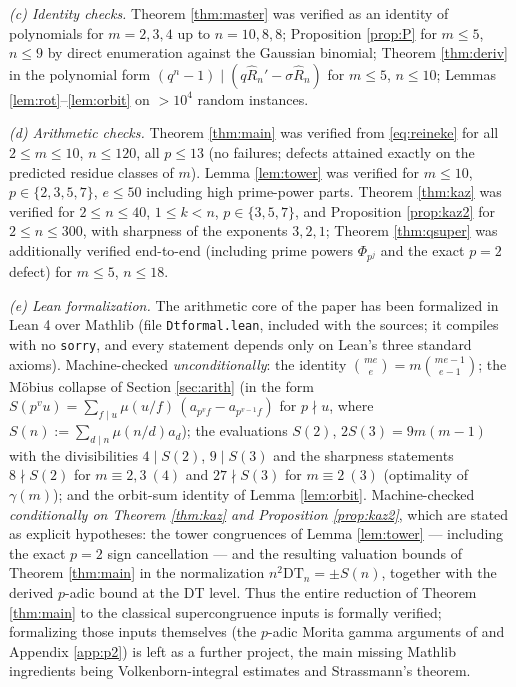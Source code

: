 \documentclass[11pt]{amsart}
\theoremstyle{definition}
\newcommand{\DT}{\mathrm{DT}}
\begin{document}
\emph{(c) Identity checks.} Theorem \ref{thm:master} was verified as an identity of polynomials for $m=2,3,4$ up to $n=10,8,8$; Proposition \ref{prop:P} for $m\le5$, $n\le9$ by direct enumeration against the Gaussian binomial; Theorem \ref{thm:deriv} in the polynomial form $(q^n-1)\mid(q\hat R_n'-\sigma\hat R_n)$ for $m\le5$, $n\le10$; Lemmas \ref{lem:rot}--\ref{lem:orbit} on $>10^4$ random instances.

\emph{(d) Arithmetic checks.} Theorem \ref{thm:main} was verified from \eqref{eq:reineke} for all $2\le m\le10$, $n\le120$, all $p\le13$ (no failures; defects attained exactly on the predicted residue classes of $m$). Lemma \ref{lem:tower} was verified for $m\le10$, $p\in\{2,3,5,7\}$, $e\le50$ including high prime-power parts. Theorem \ref{thm:kaz} was verified for $2\le n\le40$, $1\le k<n$, $p\in\{3,5,7\}$, and Proposition \ref{prop:kaz2} for $2\le n\le300$, with sharpness of the exponents $3,2,1$; Theorem \ref{thm:qsuper} was additionally verified end-to-end (including prime powers $\Phi_{p^j}$ and the exact $p=2$ defect) for $m\le5$, $n\le18$.

\emph{(e) Lean formalization.} The arithmetic core of the paper has been formalized in Lean 4 over Mathlib (file \texttt{Dtformal.lean}, included with the sources; it compiles with no \texttt{sorry}, and every statement depends only on Lean's three standard axioms). Machine-checked \emph{unconditionally}: the identity $\binom{me}{e}=m\binom{me-1}{e-1}$; the M\"obius collapse of Section \ref{sec:arith} (in the form $S(p^vu)=\sum_{f\mid u}\mu(u/f)\,(a_{p^vf}-a_{p^{v-1}f})$ for $p\nmid u$, where $S(n):=\sum_{d\mid n}\mu(n/d)a_d$); the evaluations $S(2)$, $2S(3)=9m(m-1)$ with the divisibilities $4\mid S(2)$, $9\mid S(3)$ and the sharpness statements $8\nmid S(2)$ for $m\equiv2,3\ (4)$ and $27\nmid S(3)$ for $m\equiv2\ (3)$ (optimality of $\gamma(m)$); and the orbit-sum identity of Lemma \ref{lem:orbit}. Machine-checked \emph{conditionally on Theorem \ref{thm:kaz} and Proposition \ref{prop:kaz2}}, which are stated as explicit hypotheses: the tower congruences of Lemma \ref{lem:tower} --- including the exact $p=2$ sign cancellation --- and the resulting valuation bounds of Theorem \ref{thm:main} in the normalization $n^2\DT_n=\pm S(n)$, together with the derived $p$-adic bound at the DT level. Thus the entire reduction of Theorem \ref{thm:main} to the classical supercongruence inputs is formally verified; formalizing those inputs themselves (the $p$-adic Morita gamma arguments of \cite{RobertZuber} and Appendix \ref{app:p2}) is left as a further project, the main missing Mathlib ingredients being Volkenborn-integral estimates and Strassmann's theorem.
\end{document}
